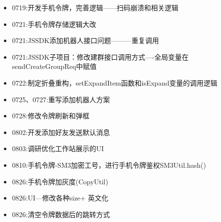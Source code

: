 \documentclass[12pt,a4paper]{ctexart}
\begin{document}
\begin{itemize}
		\item 0719:开发手机令牌，完善逻辑——扫码崩溃和相关逻辑
		\item 0721:手机令牌存储逻辑大改
		\item 0721:JSSDK添加机器人接口问题———重复调用
		\item 0721:JSSDK子项目：修改建群接口调用方式—-全局变量在sendCreateGroupReq中赋值
		\item 0722:制定折叠重构，setExpandItem函数和isExpand变量的调用逻辑
		\item 0725、0727:重写添加机器人方案
		\item 0728:修改令牌刷新和弹框
		\item 0802:开发添加好友发送默认消息
		\item 0803:调研优化工作站展示的UI
		\item 0810:手机令牌-SM3加密工号，进行手机令牌鉴权SM3Util.hash()
		\item 0826:手机令牌加灰度(CopyUtil)
		\item 0826:UI—修改各种size+ 英文化
		\item 0826:清空令牌数据后的跳转方式
	\end{itemize}
	
	\newpage
\end{document}
